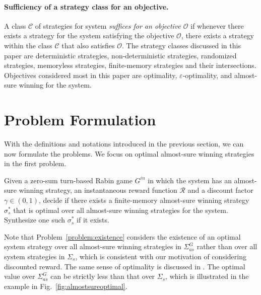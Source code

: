 \documentclass[runningheads,a4paper]{llncs}
\begin{document}
\paragraph{Sufficiency of a strategy class for an objective.} 
A class $\mathcal{C}$ of strategies for system \emph{suffices for an objective $\mathcal{O}$} if whenever there exists a strategy for the system satisfying the objective $\mathcal{O}$, there exists a strategy within the class $\mathcal{C}$ that also satisfies $\mathcal{O}$. The strategy classes discussed in this paper are deterministic strategies, non-deterministic strategies, randomized strategies, memoryless strategies, finite-memory strategies and their intersections. Objectives considered most in this paper are optimality, $\varepsilon$-optimality, and almost-sure winning for the system. 







\section{Problem Formulation}
\label{section:problemFormulation}
With the definitions and notations introduced in the previous section, we can now formulate the problems. We focus on optimal almost-sure winning strategies in the first problem. 
 


\begin{problem}
Given a zero-sum turn-based Rabin game $G^{in}$ in which the system has an almost-sure winning strategy, an instantaneous reward function $\mathcal{R}$ and a discount factor $\gamma \in (0,1)$, decide if there exists a finite-memory almost-sure winning strategy $\sigma^*_s$ that is optimal over all almost-sure winning strategies for the system. Synthesize one such $\sigma^*_s$ if it exists. 
\label{problem:existence}
\end{problem}

Note that Problem~\ref{problem:existence} considers the existence of an optimal system strategy over all almost-sure winning strategies in $\Sigma_{as}^G$ rather than over all system strategies in $\Sigma_s$, which is consistent with our motivation of considering discounted reward. The same sense of optimality is discussed in \cite{wen2015correct}. The optimal value over $\Sigma_{as}^G$ can be strictly less than that over $\Sigma_s$, which is illustrated in the example in Fig.~\ref{fig:almostsureoptimal}. 
\end{document}

